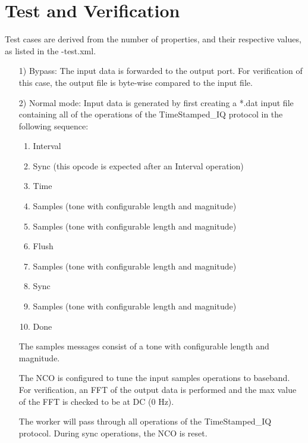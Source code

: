 \section*{Test and Verification}
Test cases are derived from the number of properties, and their respective values, as listed in the \comp-test.xml.
\begin{itemize}
	\item[1)] Bypass: The input data is forwarded to the output port. For verification of this case, the output file is byte-wise compared to the input file.
	\item[2)] Normal mode:
	Input data is generated by first creating a *.dat input file containing all of the operations of the TimeStamped\_IQ protocol in the following sequence:
\begin{enumerate}
	\item Interval
	\item Sync (this opcode is expected after an Interval operation)
	\item Time
	\item Samples (tone with configurable length and magnitude)
	\item Samples (tone with configurable length and magnitude)
	\item Flush	
	\item Samples (tone with configurable length and magnitude)
	\item Sync
	\item Samples (tone with configurable length and magnitude)
	\item Done
\end{enumerate}
The samples messages consist of a tone with configurable length and magnitude.\medskip

The NCO is configured to tune the input samples operations to baseband. For verification, an FFT of the output data is performed and the max value of the FFT is checked to be at DC (0 Hz).\medskip

The worker will pass through all operations of the TimeStamped\_IQ protocol. During sync operations, the NCO is reset.

\end{itemize}


